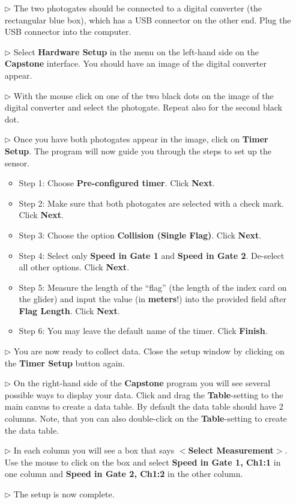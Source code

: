 \begin{itemize}
\item[$\triangleright$] The two photogates should be connected to a digital converter (the rectangular blue box), which has a USB connector on the other end. Plug the USB connector into the computer.
\item[$\triangleright$] Select \textbf{Hardware Setup} in the menu on the left-hand side on the \textbf{Capstone} interface. You should have an image of the digital converter appear.
\item[$\triangleright$] With the mouse click on one of the two black dots on the image of the digital converter and select the photogate. Repeat also for the second black dot.
\item[$\triangleright$] Once you have both photogates appear in the image, click on \textbf{Timer Setup}. The program will now guide you through the steps to set up the sensor.
  \begin{itemize}
  \item Step 1: Choose \textbf{Pre-configured timer}. Click \textbf{Next}.
  \item Step 2: Make sure that both photogates are selected with a check mark. Click \textbf{Next}.
  \item Step 3: Choose the option \textbf{Collision (Single Flag)}. Click \textbf{Next}.
  \item Step 4: Select only \textbf{Speed in Gate 1} and \textbf{Speed in Gate 2}. De-select all other options. Click \textbf{Next}.
  \item Step 5: Measure the length of the ``flag'' (the length of the index card on the glider) and input the value (in \textbf{meters}!) into the provided field after \textbf{Flag Length}. Click \textbf{Next}.
  \item Step 6: You may leave the default name of the timer. Click \textbf{Finish}.
  \end{itemize}
\item[$\triangleright$] You are now ready to collect data. Close the setup window by clicking on the \textbf{Timer Setup} button again.
\item[$\triangleright$] On the right-hand side of the \textbf{Capstone} program you will see several possible ways to display your data. Click and drag the \textbf{Table}-setting to the main canvas to create a data table. By default the data table should have 2 columns. Note, that you can also double-click on the \textbf{Table}-setting to create the data table.
\item[$\triangleright$] In each column you will see a box that says \textbf{$<$Select Measurement$>$}. Use the mouse to click on the box and select \textbf{Speed in Gate 1, Ch1:1} in one column and \textbf{Speed in Gate 2, Ch1:2} in the other column.
\item[$\triangleright$] The setup is now complete.
\end{itemize}

